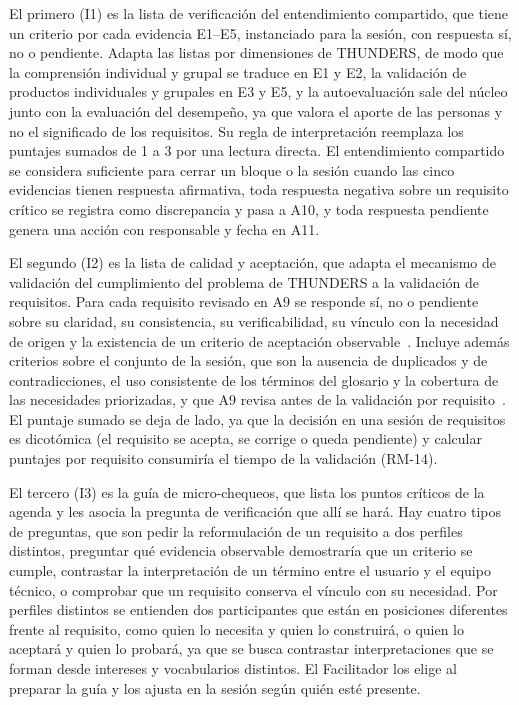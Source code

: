 \documentclass[12pt,letterpaper,oneside]{report}
\begin{document}
El primero (I1) es la lista de verificación del entendimiento compartido, que
tiene un criterio por cada evidencia E1--E5, instanciado para la sesión, con
respuesta sí, no o pendiente. Adapta las listas por dimensiones de THUNDERS, de
modo que la comprensión individual y grupal se traduce en E1 y E2, la validación
de productos individuales y grupales en E3 y E5, y la autoevaluación sale del
núcleo junto con la evaluación del desempeño, ya que valora el aporte de las
personas y no el significado de los requisitos. Su regla de interpretación
reemplaza los puntajes sumados de 1 a 3 por una lectura directa. El
entendimiento compartido se considera suficiente para cerrar un bloque o la sesión cuando
las cinco evidencias tienen respuesta afirmativa, toda respuesta negativa sobre
un requisito crítico se registra como discrepancia y pasa a A10, y toda
respuesta pendiente genera una acción con responsable y fecha en A11.

El segundo (I2) es la lista de calidad y aceptación, que adapta el mecanismo de
validación del cumplimiento del problema de THUNDERS a la validación de
requisitos. Para cada requisito revisado en A9 se responde sí, no o pendiente
sobre su claridad, su consistencia, su verificabilidad, su vínculo con la
necesidad de origen y la existencia de un criterio de aceptación
observable~\cite{behutiye2022quality}. Incluye además criterios sobre el
conjunto de la sesión, que son la ausencia de duplicados y de contradicciones,
el uso consistente de los términos del glosario y la cobertura de las
necesidades priorizadas, y que A9 revisa antes de la validación por
requisito~\cite{iso29148}. El puntaje sumado se deja de lado, ya que la decisión
en una sesión de requisitos es dicotómica (el requisito se acepta, se corrige o
queda pendiente) y calcular puntajes por requisito consumiría el tiempo de la
validación (RM-14).

El tercero (I3) es la guía de micro-chequeos, que lista los puntos críticos de
la agenda y les asocia la pregunta de verificación que allí se hará. Hay cuatro
tipos de preguntas, que son pedir la reformulación de un requisito a dos
perfiles distintos, preguntar qué evidencia observable demostraría que un
criterio se cumple, contrastar la interpretación de un término entre el usuario
y el equipo técnico, o comprobar que un requisito conserva el vínculo con su
necesidad. Por perfiles distintos se entienden dos participantes que están en
posiciones diferentes frente al requisito, como quien lo necesita y quien lo
construirá, o quien lo aceptará y quien lo probará, ya que se busca contrastar
interpretaciones que se forman desde intereses y vocabularios
distintos. El Facilitador los elige al preparar la guía y los ajusta en la
sesión según quién esté presente.
\end{document}
